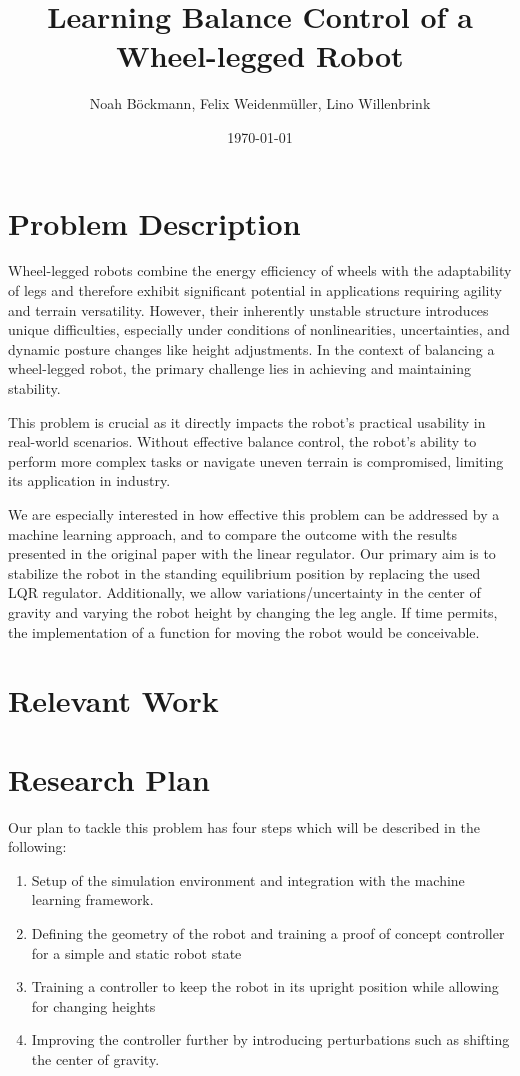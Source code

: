 \documentclass[a4paper]{article}
\title{Learning Balance Control of a Wheel-legged Robot}
\author{Noah Böckmann, Felix Weidenmüller, Lino Willenbrink}
\date{\today}
\begin{document}
\maketitle
\section{Problem Description}
Wheel-legged robots combine the energy efficiency of wheels with the adaptability of legs and therefore exhibit significant potential in applications requiring agility and terrain versatility.
However, their inherently unstable structure introduces unique difficulties, especially under conditions of nonlinearities, uncertainties, and dynamic posture changes like height adjustments.
In the context of balancing a wheel-legged robot, the primary challenge lies in achieving and maintaining stability.

This problem is crucial as it directly impacts the robot's practical usability in real-world scenarios.
Without effective balance control, the robot's ability to perform more complex tasks or navigate uneven terrain is compromised, limiting its application in industry.

We are especially interested in how effective this problem can be addressed by a machine learning approach, and to compare the outcome with the results presented in the original paper with the linear regulator.
Our primary aim is to stabilize the robot in the standing equilibrium position by replacing the used LQR regulator. Additionally, we allow variations/uncertainty in the center of gravity and varying the robot height by changing the leg angle.
If time permits, the implementation of a function for moving the robot would be conceivable.


\section{Relevant Work}

\section{Research Plan}
Our plan to tackle this problem has four steps which will be described in the following:
\begin{enumerate}
  \item Setup of the simulation environment and integration with the machine learning framework.
  \item Defining the geometry of the robot and training a proof of concept controller for a simple
        and static robot state
  \item Training a controller to keep the robot in its upright position while allowing for changing heights
  \item Improving the controller further by introducing perturbations such as shifting the center of
        gravity.
\end{enumerate}
\end{document}

